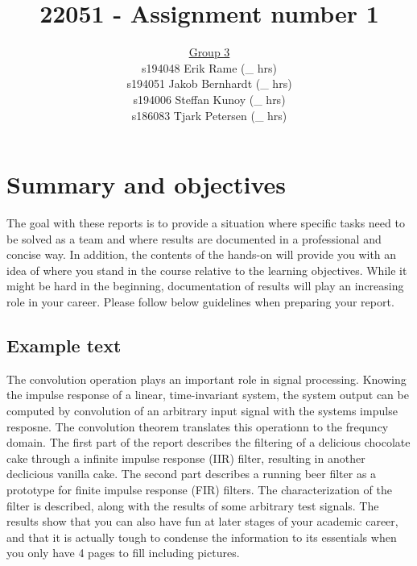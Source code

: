 \documentclass[journal]{IEEEtran}
\begin{document}
\title{22051 - Assignment number 1}
\author{\underline{Group 3}\\ s194048 Erik Rame (\_ hrs) \\ s194051 Jakob Bernhardt (\_ hrs) \\ s194006 Steffan Kunoy (\_ hrs) \\ s186083 Tjark Petersen (\_ hrs)}


\maketitle


\section{Summary and objectives}
The goal with these reports is to provide a situation where specific tasks need to be solved as a team and where results are documented in a professional and concise way. In addition, the contents of the hands-on will provide you with an idea of where you stand in the course relative to the learning objectives. While it might be hard in the beginning, documentation of results will play an increasing role in your career. Please follow below guidelines when preparing your report.

\subsection{Example text} 
The convolution operation plays an important role in signal processing. Knowing the impulse response of a linear, time-invariant system, the system output can be computed by convolution of an arbitrary input signal with the systems impulse resposne. The convolution theorem translates this operationn to the frequncy domain.
The first part of the report describes the filtering of a delicious chocolate cake through a infinite impulse response (IIR) filter, resulting in another declicious vanilla cake. The second part describes a running beer filter as a prototype for finite impulse response (FIR) filters. The characterization of the filter is described, along with the results of some arbitrary test signals.
The results show that you can also have fun at later stages of your academic career, and that it is actually tough to condense the information to its essentials when you only have 4 pages to fill including pictures.
\end{document}
